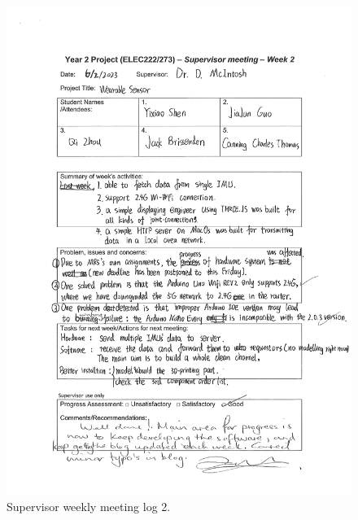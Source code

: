 \documentclass[12pt, a4paper]{report}
\begin{document}
\begin{figure}[htbp]
	\centering
	\includegraphics[width=\textwidth]{
		appendix/meeting-log-2}
	\caption{Supervisor weekly meeting log 2.}
	\label{fig:meeting-log-2}
\end{figure}
\end{document}
